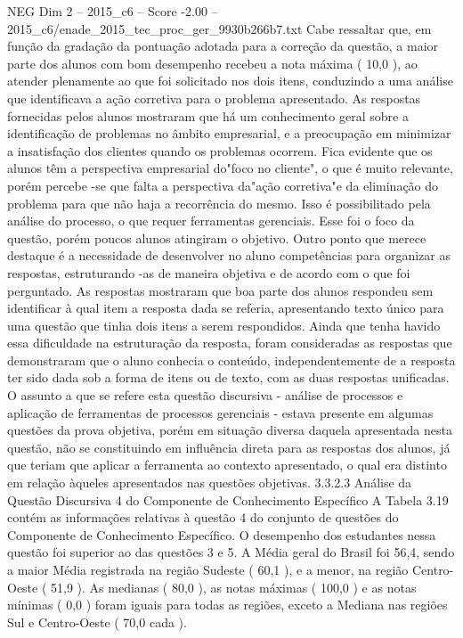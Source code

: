 \begin{textsample}{NEG Dim 2 – 2015\_c6 – Score -2.00 – 2015\_c6/enade\_2015\_tec\_proc\_ger\_9930b266b7.txt}
Cabe ressaltar que, em função da gradação da pontuação adotada para a correção da questão, a maior parte dos alunos com bom desempenho recebeu a nota máxima ( 10,0 ), ao atender plenamente ao que foi solicitado nos dois itens, conduzindo a uma análise que identificava a ação corretiva para o problema apresentado.
As respostas fornecidas pelos alunos mostraram que há um conhecimento geral sobre a identificação de problemas no âmbito empresarial, e a preocupação em minimizar a insatisfação dos clientes quando os problemas ocorrem.
Fica evidente que os alunos têm a perspectiva empresarial do"foco no cliente", o que é muito relevante, porém percebe -se que falta a perspectiva da"ação corretiva"e da eliminação do problema para que não haja a recorrência do mesmo.
Isso é possibilitado pela análise do processo, o que requer ferramentas gerenciais.
Esse foi o foco da questão, porém poucos alunos atingiram o objetivo.
Outro ponto que merece destaque é a necessidade de desenvolver no aluno competências para organizar as respostas, estruturando -as de maneira objetiva e de acordo com o que foi perguntado.
As respostas mostraram que boa parte dos alunos respondeu sem identificar à qual item a resposta dada se referia, apresentando texto único para uma questão que tinha dois itens a serem respondidos.
Ainda que tenha havido essa dificuldade na estruturação da resposta, foram consideradas as respostas que demonstraram que o aluno conhecia o conteúdo, independentemente de a resposta ter sido dada sob a forma de itens ou de texto, com as duas respostas unificadas.
O assunto a que se refere esta questão discursiva - análise de processos e aplicação de ferramentas de processos gerenciais - estava presente em algumas questões da prova objetiva, porém em situação diversa daquela apresentada nesta questão, não se constituindo em influência direta para as respostas dos alunos, já que teriam que aplicar a ferramenta ao contexto apresentado, o qual era distinto em relação àqueles apresentados nas questões objetivas. 3.3.2.3 Análise da Questão Discursiva 4 do Componente de Conhecimento Específico A Tabela 3.19 contém as informações relativas à questão 4 do conjunto de questões do Componente de Conhecimento Específico.
O desempenho dos estudantes nessa questão foi superior ao das questões 3 e 5.
A Média geral do Brasil foi 56,4, sendo a maior Média registrada na região Sudeste ( 60,1 ), e a menor, na região Centro-Oeste ( 51,9 ).
As medianas ( 80,0 ), as notas máximas ( 100,0 ) e as notas mínimas ( 0,0 ) foram iguais para todas as regiões, exceto a Mediana nas regiões Sul e Centro-Oeste ( 70,0 cada ).

\end{textsample}
